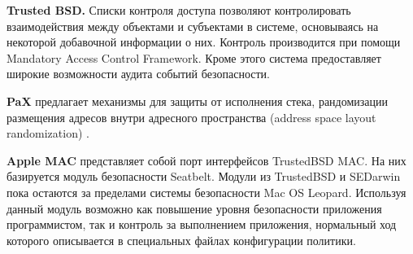 \bigskip
{\bfseries Trusted BSD.} Списки контроля доступа позволяют контролировать взаимодействия между объектами и субъектами в системе, основываясь на некоторой добавочной информации о них. Контроль производится при помощи Mandatory Access Control Framework. Кроме этого система предоставляет широкие возможности аудита событий безопасности. 

\bigskip
{\bfseries PaX} предлагает механизмы для защиты от исполнения стека, рандомизации размещения адресов внутри адресного пространства (address space layout randomization) . 

\bigskip
{\bfseries Apple MAC} представляет собой порт интерфейсов TrustedBSD MAC. На них базируется модуль безопасности Seatbelt. Модули из TrustedBSD и SEDarwin пока остаются за пределами системы безопасности Mac OS Leopard. Используя данный модуль возможно как повышение уровня безопасности приложения программистом, так и контроль за выполнением приложения, нормальный ход которого описывается в специальных файлах конфигурации политики.

